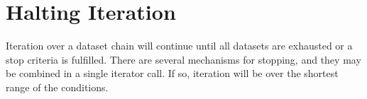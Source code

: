 












\section{Halting Iteration}

Iteration over a dataset chain will continue until all datasets are
exhausted or a stop criteria is fulfilled.  There are several
mechanisms for stopping, and they may be combined in a single iterator
call.  If so, iteration will be over the shortest range of the
conditions.

